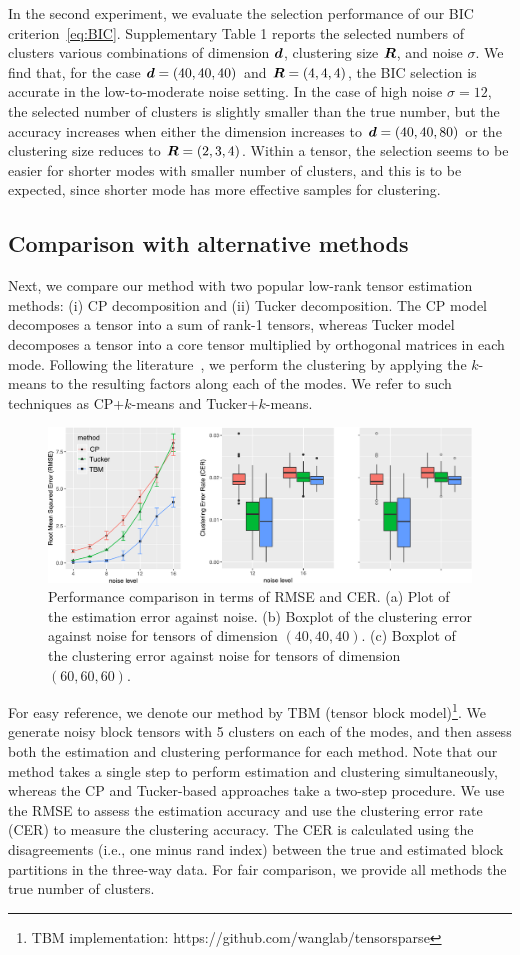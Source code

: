 \documentclass{article}
\begin{document}
In the second experiment, we evaluate the selection performance of our BIC criterion~\eqref{eq:BIC}. Supplementary Table 1 reports the selected numbers of clusters various combinations of dimension $\bm{d}$, clustering size $\bm{R}$, and noise $\sigma$. We find that, for the case $\bm{d}=(40,40,40)$ and $\bm{R}=(4,4,4)$, the BIC selection is accurate in the low-to-moderate noise setting. In the case of high noise $\sigma=12$, the 
selected number of clusters is slightly smaller than the true number, but the accuracy increases when either the dimension increases to $\bm{d}=(40,40,80)$ or the clustering size reduces to $\bm{R}=(2,3,4)$. Within a tensor, the selection seems to be easier for shorter modes with smaller number of clusters, and this is to be expected, since shorter mode has more effective samples for clustering. 


\subsection{Comparison with alternative methods}
Next, we compare our method with two popular low-rank tensor estimation methods: (i) CP decomposition and (ii) Tucker decomposition. The CP model decomposes a tensor into a sum of rank-1 tensors, whereas Tucker model decomposes a tensor into a core tensor multiplied by orthogonal matrices in each mode. Following the literature~\cite{chi2018provable}, we perform the clustering by applying the $k$-means to the resulting factors along each of the modes. We refer to such techniques as CP+$k$-means and Tucker+$k$-means. 

\begin{figure}
	\centering
\includegraphics[width=.8\textwidth]{figures/test}
	\caption{Performance comparison in terms of RMSE and CER. (a) Plot of the estimation error against noise. (b) Boxplot of the clustering error against noise for tensors of dimension $(40,40,40)$. (c) Boxplot of the clustering error against noise for tensors of dimension $(60,60,60)$.} \label{fig4}
\end{figure}

For easy reference, we denote our method by TBM (tensor block model)\footnote{TBM implementation: https://github.com/wanglab/tensorsparse}. We generate noisy block tensors with 5 clusters on each of the modes, and then assess both the estimation and clustering performance for each method. Note that our method takes a single step to perform estimation and clustering simultaneously, whereas the CP and Tucker-based approaches take a two-step procedure. We use the RMSE to assess the estimation accuracy and use the clustering error rate (CER) to measure the clustering accuracy. The CER is calculated using the disagreements (i.e., one minus rand index) between the true and estimated block partitions in the three-way data. For fair comparison, we provide all methods the true number of clusters. 
\end{document}
